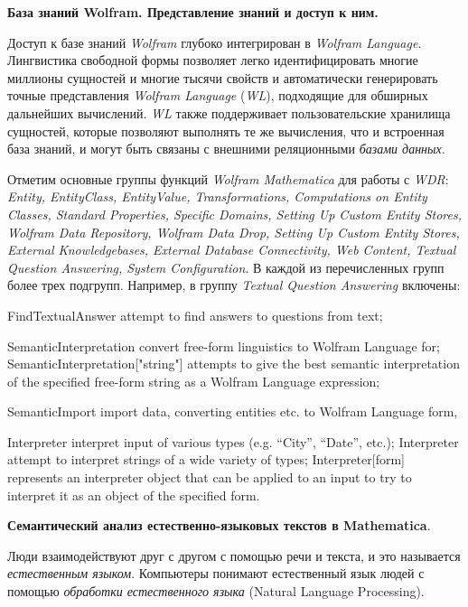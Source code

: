 \textbf{База знаний Wolfram. Представление знаний и доступ к ним.}

Доступ к базе знаний \textit{Wolfram} глубоко интегрирован в \textit{Wolfram Language}. Лингвистика свободной формы позволяет легко идентифицировать многие миллионы сущностей и многие тысячи свойств и автоматически генерировать точные представления \textit{Wolfram Language} (\textit{WL}), подходящие для обширных дальнейших вычислений. \textit{WL} также поддерживает пользовательские хранилища сущностей, которые позволяют выполнять те же вычисления, что и встроенная база знаний, и могут быть связаны с внешними реляционными \textit{базами данных}. 

Отметим основные группы функций \textit{Wolfram Mathematica} для работы с \textit{WDR}: 
\textit{Entity, EntityClass, EntityValue, Transformations, Computations on Entity Classes, Standard Properties, Specific Domains, Setting Up Custom Entity Stores, Wolfram Data Repository, Wolfram Data Drop, Setting Up Custom Entity Stores, External Knowledgebases, External Database Connectivity, Web Content, Textual Question Answering, System Configuration}. 
В каждой из перечисленных групп более трех подгрупп. Например, в группу \textit{Textual Question Answering} включены: 
\begin{textitemize}
	\item FindTextualAnswer attempt to find answers to questions from text;
	\item SemanticInterpretation convert free-form linguistics to Wolfram Language for; SemanticInterpretation["string"] attempts to give the best semantic interpretation of the specified free-form string as a Wolfram Language expression; 
	\item SemanticImport import data, converting entities etc. to Wolfram Language form, 
	\item Interpreter interpret input of various types (e.g. ``City'', ``Date'', etc.); Interpreter attempt to interpret strings of a wide variety of types; Interpreter[form] represents an interpreter object that can be applied to an input to try to interpret it as an object of the specified form.
\end{textitemize}

\textbf{Семантический анализ естественно-языковых текстов в Mathematica}. 

Люди взаимодействуют друг с другом с помощью речи и текста, и это называется \textit{естественным языком}. Компьютеры понимают естественный язык людей с помощью \textit{обработки естественного языка} (Natural Language Processing).

